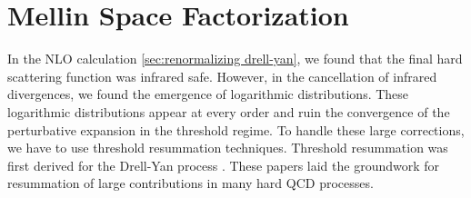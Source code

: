 \section{Mellin Space Factorization}\label{sec:Resummation Drell-yan}
In the NLO calculation \cref{sec:renormalizing drell-yan}, we found that the final hard scattering function was infrared safe. However, in the cancellation of infrared divergences, we found the emergence of logarithmic distributions. These logarithmic distributions appear at every order and ruin the convergence of the perturbative expansion in the threshold regime. To handle these large corrections, we have to use threshold resummation techniques. Threshold resummation was first derived for the Drell-Yan process \cite{Sterman:1986aj,CATANI1989}. These papers laid the groundwork for resummation of large contributions in many hard QCD processes. 

